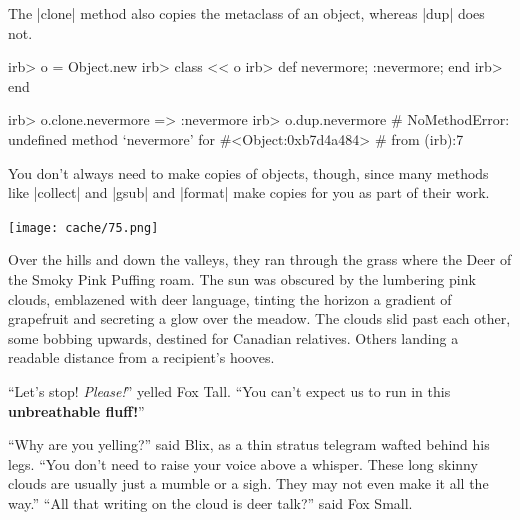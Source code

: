 \documentclass[12pt,twoside]{report}
\begin{document}
The \rubyinline|clone| method also copies the
metaclass of an object, whereas \rubyinline|dup| does
not.


\begin{consolecode}

 irb> o = Object.new
 irb> class << o
 irb>   def nevermore; :nevermore; end
 irb> end

 irb> o.clone.nevermore
   => :nevermore
 irb> o.dup.nevermore
 # NoMethodError: undefined method `nevermore' for #<Object:0xb7d4a484>
 #         from (irb):7

\end{consolecode}



You don't always need to make copies of objects, though, since many
methods like \rubyinline|collect| and
\rubyinline|gsub| and
\rubyinline|format| make copies for you as part of
their work.

	\texttt{[image: cache/75.png]}

Over the hills and down the valleys, they ran through the grass where
the Deer of the Smoky Pink Puffing roam.  The sun was obscured by the
lumbering pink clouds, emblazened with deer language, tinting the
horizon a gradient of grapefruit and secreting a glow over the meadow.
The clouds slid past each other, some bobbing upwards, destined for
Canadian relatives.  Others landing a readable distance from a
recipient's hooves.

``Let's stop!  {\em Please!}'' yelled Fox Tall.  ``You can't expect us
to run in this {\bf unbreathable fluff!}''

``Why are you yelling?'' said Blix, as a thin stratus telegram wafted
behind his legs.  ``You don't need to raise your voice above a
whisper.  These long skinny clouds are usually just a mumble or a
sigh.  They may not even make it all the way.''  ``All that writing on
the cloud is deer talk?'' said Fox Small.
\end{document}
